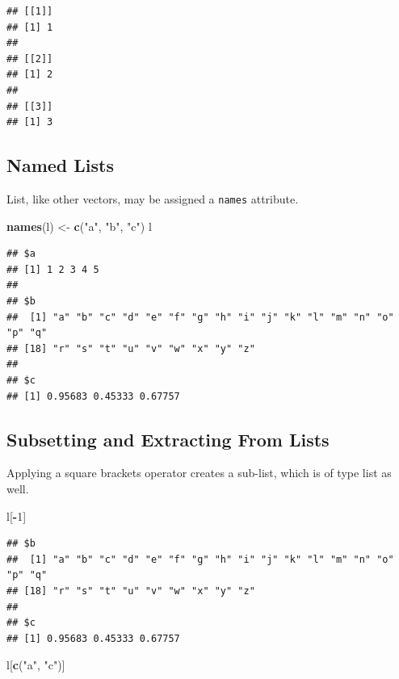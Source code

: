 \documentclass[10pt,b5paper,krantz1]{krantz}
\newenvironment{Shaded}{\begin{snugshade}}{\end{snugshade}}
\newcommand{\DecValTok}[1]{\textcolor[rgb]{0.06,0.06,0.06}{#1}}
\newcommand{\KeywordTok}[1]{\textcolor[rgb]{0.27,0.27,0.27}{\textbf{#1}}}
\newcommand{\NormalTok}[1]{#1}
\newcommand{\OperatorTok}[1]{\textcolor[rgb]{0.43,0.43,0.43}{\textbf{#1}}}
\newcommand{\StringTok}[1]{\textcolor[rgb]{0.5,0.5,0.5}{#1}}
\begin{document}
\begin{verbatim}
## [[1]]
## [1] 1
## 
## [[2]]
## [1] 2
## 
## [[3]]
## [1] 3
\end{verbatim}

\hypertarget{named-lists}{%
\subsection{Named Lists}\label{named-lists}}

List, like other vectors, may be assigned a \texttt{names} attribute.

\begin{Shaded}
\begin{Highlighting}[]
\KeywordTok{names}\NormalTok{(l) <-}\StringTok{ }\KeywordTok{c}\NormalTok{(}\StringTok{"a"}\NormalTok{, }\StringTok{"b"}\NormalTok{, }\StringTok{"c"}\NormalTok{)}
\NormalTok{l}
\end{Highlighting}
\end{Shaded}

\begin{verbatim}
## $a
## [1] 1 2 3 4 5
## 
## $b
##  [1] "a" "b" "c" "d" "e" "f" "g" "h" "i" "j" "k" "l" "m" "n" "o" "p" "q"
## [18] "r" "s" "t" "u" "v" "w" "x" "y" "z"
## 
## $c
## [1] 0.95683 0.45333 0.67757
\end{verbatim}

\hypertarget{subsetting-and-extracting-from-lists}{%
\subsection{Subsetting and Extracting From Lists}\label{subsetting-and-extracting-from-lists}}

Applying a square brackets operator creates a sub-list, which is
of type list as well.

\begin{Shaded}
\begin{Highlighting}[]
\NormalTok{l[}\OperatorTok{-}\DecValTok{1}\NormalTok{]}
\end{Highlighting}
\end{Shaded}

\begin{verbatim}
## $b
##  [1] "a" "b" "c" "d" "e" "f" "g" "h" "i" "j" "k" "l" "m" "n" "o" "p" "q"
## [18] "r" "s" "t" "u" "v" "w" "x" "y" "z"
## 
## $c
## [1] 0.95683 0.45333 0.67757
\end{verbatim}

\begin{Shaded}
\begin{Highlighting}[]
\NormalTok{l[}\KeywordTok{c}\NormalTok{(}\StringTok{"a"}\NormalTok{, }\StringTok{"c"}\NormalTok{)]}
\end{Highlighting}
\end{Shaded}
\end{document}
